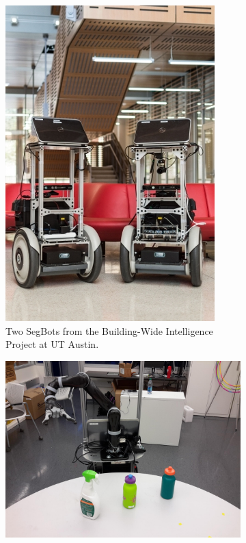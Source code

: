 \documentclass[runningheads,a4paper]{llncs}
\begin{document}
\begin{figure}	
	\centering
	\begin{subfigure}[t]{1.4in}
		\centering
        \includegraphics[width=\textwidth]{images/bwi1.jpg}
		\caption{Two SegBots from the Building-Wide Intelligence Project at UT Austin.}\label{fig:1a}		
	\end{subfigure}
	\quad
	\begin{subfigure}[t]{1.4in}
		\centering
        \includegraphics[width=\textwidth]{images/bwi_arm.jpg}

\end{subfigure}
\end{figure}
\end{document}
